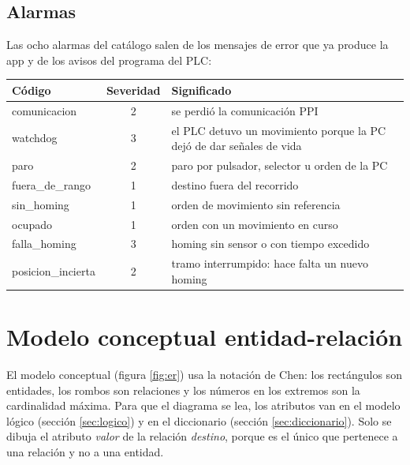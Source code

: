 \documentclass[a4paper,11pt]{article}
\begin{document}
\subsection{Alarmas}
Las ocho alarmas del catálogo salen de los mensajes de error que ya produce la app y de los avisos del programa del PLC:
\begin{center}\small
\begin{tabular}{>{\ttfamily}l c l}
\toprule
\textrm{\textbf{Código}} & \textbf{Severidad} & \textbf{Significado}\\
\midrule
comunicacion & 2 & se perdió la comunicación PPI\\
watchdog & 3 & el PLC detuvo un movimiento porque la PC dejó de dar señales de vida\\
paro & 2 & paro por pulsador, selector u orden de la PC\\
fuera\_de\_rango & 1 & destino fuera del recorrido\\
sin\_homing & 1 & orden de movimiento sin referencia\\
ocupado & 1 & orden con un movimiento en curso\\
falla\_homing & 3 & homing sin sensor o con tiempo excedido\\
posicion\_incierta & 2 & tramo interrumpido: hace falta un nuevo homing\\
\bottomrule
\end{tabular}
\end{center}

\section{Modelo conceptual entidad-relación}\label{sec:er}

El modelo conceptual (figura \ref{fig:er}) usa la notación de Chen: los rectángulos son entidades, los rombos son relaciones y los números en los extremos son la cardinalidad máxima. Para que el diagrama se lea, los atributos van en el modelo lógico (sección \ref{sec:logico}) y en el diccionario (sección \ref{sec:diccionario}). Solo se dibuja el atributo \emph{valor} de la relación \emph{destino}, porque es el único que pertenece a una relación y no a una entidad.
\end{document}
